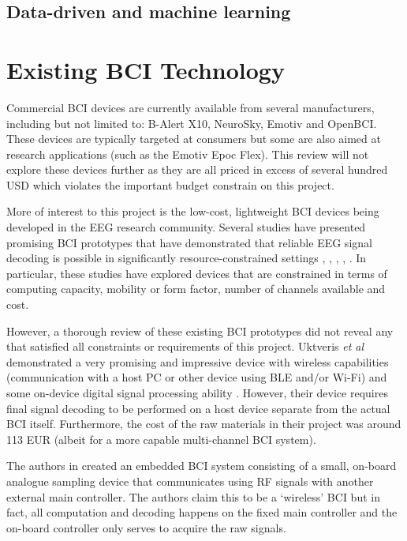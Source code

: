 \subsection{Data-driven and machine learning}

\section{Existing BCI Technology}
\label{section:existing-bci-tech-c2}
Commercial BCI devices are currently available from several manufacturers, including but not limited to: B-Alert X10, NeuroSky, Emotiv and OpenBCI. These devices are typically targeted at consumers but some are also aimed at research applications (such as the Emotiv Epoc Flex). This review will not explore these devices further as they are all priced in excess of several hundred USD which violates the important budget constrain on this project.

More of interest to this project is the low-cost, lightweight BCI devices being developed in the EEG research community. Several studies have presented promising BCI prototypes that have demonstrated that reliable EEG signal decoding is possible in significantly resource-constrained settings \cite{uktveris-modular-bci}, \cite{de-vos-p300-speller}, \cite{liao-gaming-control}, \cite{chai-embedded-bci}, \cite{acampora-svm-clf}. In particular, these studies have explored devices that are constrained in terms of computing capacity, mobility or form factor, number of channels available and cost. 

However, a thorough review of these existing BCI prototypes did not reveal any that satisfied all constraints or requirements of this project. Uktveris \textit{et al} demonstrated a very promising and impressive device with wireless capabilities (communication with a host PC or other device using BLE and/or Wi-Fi) and some on-device digital signal processing ability \cite{uktveris-modular-bci}. However, their device requires final signal decoding to be performed on a host device separate from the actual BCI itself. Furthermore, the cost of the raw materials in their project was around 113 EUR \cite{uktveris-modular-bci} (albeit for a more capable multi-channel BCI system).

The authors in \cite{chai-embedded-bci} created an embedded BCI system consisting of a small, on-board analogue sampling device that communicates using RF signals with another external main controller. The authors claim this to be a `wireless' BCI but in fact, all computation and decoding happens on the fixed main controller and the on-board controller only serves to acquire the raw signals. 

